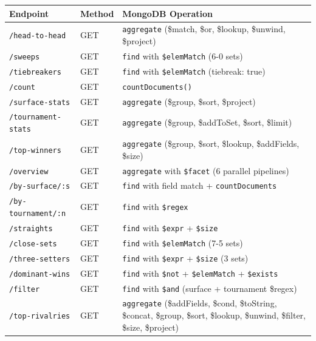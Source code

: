 \documentclass[12pt,a4paper]{article}
\begin{document}
\begin{longtable}{|p{4.5cm}|l|p{5cm}|}
    \hline
    \textbf{Endpoint} & \textbf{Method} & \textbf{MongoDB Operation} \\
    \hline
    \endhead
    \texttt{/head-to-head} & GET & \texttt{aggregate} (\$match, \$or, \$lookup, \$unwind, \$project) \\
    \hline
    \texttt{/sweeps} & GET & \texttt{find} with \texttt{\$elemMatch} (6-0 sets) \\
    \hline
    \texttt{/tiebreakers} & GET & \texttt{find} with \texttt{\$elemMatch} (tiebreak: true) \\
    \hline
    \texttt{/count} & GET & \texttt{countDocuments()} \\
    \hline
    \texttt{/surface-stats} & GET & \texttt{aggregate} (\$group, \$sort, \$project) \\
    \hline
    \texttt{/tournament-stats} & GET & \texttt{aggregate} (\$group, \$addToSet, \$sort, \$limit) \\
    \hline
    \texttt{/top-winners} & GET & \texttt{aggregate} (\$group, \$sort, \$lookup, \$addFields, \$size) \\
    \hline
    \texttt{/overview} & GET & \texttt{aggregate} with \texttt{\$facet} (6 parallel pipelines) \\
    \hline
    \texttt{/by-surface/:s} & GET & \texttt{find} with field match + \texttt{countDocuments} \\
    \hline
    \texttt{/by-tournament/:n} & GET & \texttt{find} with \texttt{\$regex} \\
    \hline
    \texttt{/straights} & GET & \texttt{find} with \texttt{\$expr} + \texttt{\$size} \\
    \hline
    \texttt{/close-sets} & GET & \texttt{find} with \texttt{\$elemMatch} (7-5 sets) \\
    \hline
    \texttt{/three-setters} & GET & \texttt{find} with \texttt{\$expr} + \texttt{\$size} (3 sets) \\
    \hline
    \texttt{/dominant-wins} & GET & \texttt{find} with \texttt{\$not} + \texttt{\$elemMatch} + \texttt{\$exists} \\
    \hline
    \texttt{/filter} & GET & \texttt{find} with \texttt{\$and} (surface + tournament \$regex) \\
    \hline
    \texttt{/top-rivalries} & GET & \texttt{aggregate} (\$addFields, \$cond, \$toString, \$concat, \$group, \$sort, \$lookup, \$unwind, \$filter, \$size, \$project) \\
    \hline
\end{longtable}
\end{document}
